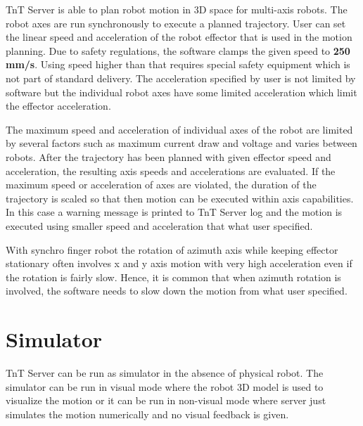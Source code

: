 TnT Server is able to plan robot motion in 3D space for multi-axis robots. The robot axes are run synchronously to execute a planned trajectory. User can set the linear speed and acceleration of the robot effector that is used in the motion planning. Due to safety regulations, the software clamps the given speed to \textbf{250 mm/s}. Using speed higher than that requires special safety equipment which is not part of standard delivery. The acceleration specified by user is not limited by software but the individual robot axes have some limited acceleration which limit the effector acceleration.


The maximum speed and acceleration of individual axes of the robot are limited by several factors such as maximum current draw and voltage and varies between robots. After the trajectory has been planned with given effector speed and acceleration, the resulting axis speeds and accelerations are evaluated. If the maximum speed or acceleration of axes are violated, the duration of the trajectory is scaled so that then motion can be executed within axis capabilities. In this case a warning message is printed to TnT Server log and the motion is executed using smaller speed and acceleration that what user specified.

With synchro finger robot the rotation of azimuth axis while keeping effector stationary often involves x and y axis motion with very high acceleration even if the rotation is fairly slow. Hence, it is common that when azimuth rotation is involved, the software needs to slow down the motion from what user specified.


\section{Simulator}

TnT Server can be run as simulator in the absence of physical robot. The simulator can be run in visual mode where the robot 3D model is used to visualize the motion or it can be run in non-visual mode where server just simulates the motion numerically and no visual feedback is given.


